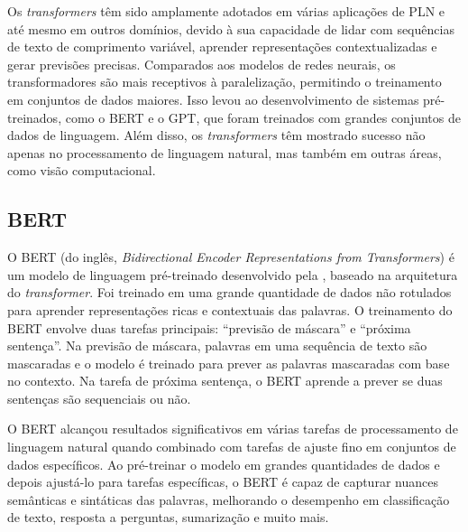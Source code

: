 

Os \textit{transformers} têm sido amplamente adotados em várias aplicações de PLN e até mesmo em outros domínios, devido à sua capacidade de lidar com sequências de texto de comprimento variável, aprender representações contextualizadas e gerar previsões precisas. Comparados aos modelos de redes neurais, os transformadores são mais receptivos à paralelização, permitindo o treinamento em conjuntos de dados maiores. Isso levou ao desenvolvimento de sistemas pré-treinados, como o BERT e o GPT, que foram treinados com grandes conjuntos de dados de linguagem. Além disso, os \textit{transformers} têm mostrado sucesso não apenas no processamento de linguagem natural, mas também em outras áreas, como visão computacional.

\subsection{BERT}


O BERT (do inglês, \textit{Bidirectional Encoder Representations from Transformers}) é um modelo de linguagem pré-treinado desenvolvido pela , baseado na arquitetura do \textit{transformer}. Foi treinado em uma grande quantidade de dados não rotulados para aprender representações ricas e contextuais das palavras. O treinamento do BERT envolve duas tarefas principais: ``previsão de máscara'' e ``próxima sentença''. Na previsão de máscara, palavras em uma sequência de texto são mascaradas e o modelo é treinado para prever as palavras mascaradas com base no contexto. Na tarefa de próxima sentença, o BERT aprende a prever se duas sentenças são sequenciais ou não.

O BERT alcançou resultados significativos em várias tarefas de processamento de linguagem natural quando combinado com tarefas de ajuste fino em conjuntos de dados específicos. Ao pré-treinar o modelo em grandes quantidades de dados e depois ajustá-lo para tarefas específicas, o BERT é capaz de capturar nuances semânticas e sintáticas das palavras, melhorando o desempenho em classificação de texto, resposta a perguntas, sumarização e muito mais.

